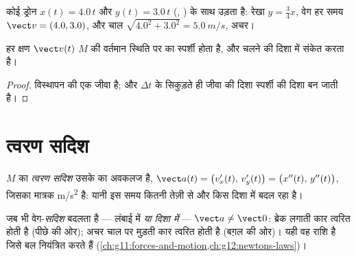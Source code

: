 \begin{example}\label{ex:g12:kinematics-2d:drone}
कोई ड्रोन $x(t) = 4.0\,t$ और $y(t) = 3.0\,t$ (, ) के साथ उड़ता है:  रेखा
$y = \tfrac34 x$, वेग हर समय $\vect v = (4.0, 3.0)$, और चाल $\sqrt{4.0^2 + 3.0^2} = \qty{5.0}{m/s}$, अचर।
\end{example}

\begin{proposition}[गतिपथ का स्पर्शी]\label{prop:g12:kinematics-2d:tangent}
हर क्षण $\vect v(t)$ $M$ की वर्तमान स्थिति पर  का स्पर्शी होता है,
और चलने की दिशा में संकेत करता है।
\end{proposition}

\begin{proof}
विस्थापन  की एक जीवा है; और $\Delta t$ के सिकुड़ते ही जीवा की दिशा
स्पर्शी की दिशा बन जाती है।
\end{proof}

\section{त्वरण सदिश}

\begin{definition}[त्वरण सदिश]\label{def:g12:kinematics-2d:acceleration}
$M$ का \emph{त्वरण सदिश} उसके  का अवकलज
है, $\vect a(t) = \bigl(v_x'(t),\, v_y'(t)\bigr) =
\bigl(x''(t),\, y''(t)\bigr)$, जिसका मात्रक \unit{m/s^2} है: यानी  इस समय कितनी तेज़ी
से और किस दिशा में बदल रहा है।
\end{definition}

\begin{remark}[चाल बढ़ाए बिना त्वरण]\label{rem:g12:kinematics-2d:turning}
जब भी वेग-\emph{सदिश} बदलता है --- लंबाई में \emph{या दिशा में} --- $\vect a \neq \vect 0$:
ब्रेक लगाती कार त्वरित होती है (पीछे की ओर); अचर चाल पर मुड़ती कार
त्वरित होती है (बग़ल की ओर)। यही वह राशि है जिसे बल नियंत्रित करते हैं
(\cref{ch:g11:forces-and-motion,ch:g12:newtons-laws})।
\end{remark}

